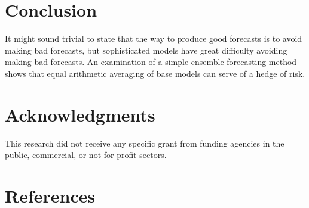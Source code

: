 \documentclass[11pt,3p,review,authoryear]{elsarticle}
\begin{document}
\section{Conclusion}
It might sound trivial to state that the way to produce good forecasts is to avoid making bad forecasts, but sophisticated models have great difficulty avoiding making bad forecasts. An examination of a simple ensemble forecasting method shows that equal arithmetic averaging of base models can serve of a hedge of risk.

\section*{Acknowledgments}

This research did not receive any specific grant from funding agencies in the public, commercial, or not-for-profit sectors.


\section{References}

\end{document}
